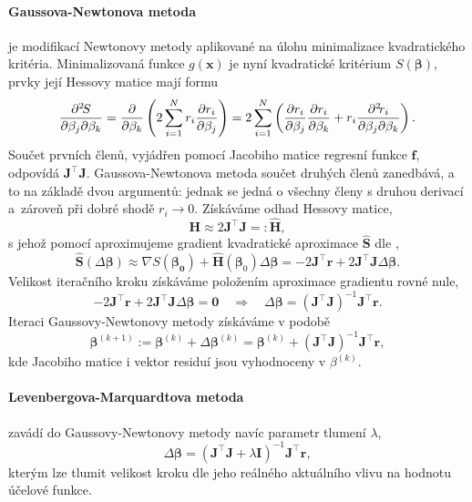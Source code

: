 \paragraph{Gaussova-Newtonova metoda} je modifikací Newtonovy metody aplikované na úlohu minimalizace kvadratického kritéria. Minimalizovaná funkce $g(\bm{x})$ je nyní kvadratické kritérium $S(\bm{\beta})$, prvky její Hessovy matice mají formu
\begin{equation}
    \frac{\partial^2 \! S}{\partial \beta_j \partial \beta_k}=\frac{\partial }{\partial \beta_k}\left(2\sum_{i=1}^{N}r_i\frac{\partial r_i}{\partial \beta_j}\right)=2\sum_{i=1}^{N}\left(\frac{\partial r_i}{\partial \beta_j}\frac{\partial r_i}{\partial \beta_k}+r_i\frac{\partial^2 \! r_i}{\partial \beta_j \partial \beta_k}\right).
\end{equation}
Součet prvních členů, vyjádřen pomocí Jacobiho matice regresní funkce $\bm{f}$, odpovídá $\mathbf{J}^\top\mathbf{J}$. Gaussova-Newtonova metoda součet druhých členů zanedbává, a to na základě dvou argumentů: jednak se jedná o všechny členy s druhou derivací a~zároveň při dobré shodě $r_i\to0$. Získáváme odhad Hessovy matice,
\begin{equation}
    \mathbf{H}\approx 2\mathbf{J}^\top\mathbf{J}=:\hat{\mathbf{H}},
\end{equation}
s jehož pomocí aproximujeme gradient kvadratické aproximace $\hat{\mathbf{S}}$ dle ,
\begin{equation}
    \hat{\mathbf{S}}(\Delta\bm{\beta})\approx\nabla S(\bm{\beta_0})+\hat{\mathbf{H}}(\bm{\beta}_0)\Delta\bm{\beta}=-2\mathbf{J}^\top\bm{r}+2\mathbf{J}^\top\mathbf{J}\Delta\bm{\beta}.
\end{equation}
Velikost iteračního kroku získáváme položením aproximace gradientu rovné nule,
\begin{equation}
    -2\mathbf{J}^\top\bm{r}+2\mathbf{J}^\top\mathbf{J}\Delta\bm{\beta}=\bm{0}
    \quad\Longrightarrow\quad
    \Delta\bm{\beta}=\left(\mathbf{J}^\top\mathbf{J}\right)^{-1}\mathbf{J}^\top\bm{r}.
\end{equation}
Iteraci Gaussovy-Newtonovy metody získáváme v podobě
\begin{equation} 
    \bm{\beta}^{(k+1)}:=\bm{\beta}^{(k)}+\Delta\bm{\beta}^{(k)}=\bm{\beta}^{(k)}+\left(\mathbf{J}^\top\mathbf{J}\right)^{-1}\mathbf{J}^\top\bm{r},
\end{equation}
kde Jacobiho matice i vektor residuí jsou vyhodnoceny v $\beta^{(k)}$.

\paragraph{Levenbergova-Marquardtova metoda} zavádí do Gaussovy-Newtonovy metody navíc parametr tlumení $\lambda$,
\begin{equation}
    \Delta\bm{\beta}=\left(\mathbf{J}^\top\mathbf{J}+\lambda\mathbf{I}\right)^{-1}\mathbf{J}^\top\bm{r},
\end{equation}
kterým lze tlumit velikost kroku dle jeho reálného aktuálního vlivu na hodnotu účelové funkce.

